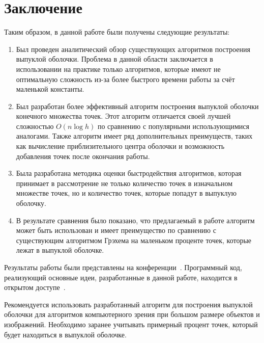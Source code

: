 \chapter*{Заключение}						%


Таким образом, в данной работе были получены следующие результаты:
\begin{enumerate}
	\item Был проведен аналитический обзор существующих алгоритмов построения выпуклой оболочки. Проблема в данной области заключается в использовании на практике только алгоритмов, которые имеют не оптимальную сложность из-за более быстрого времени работы за счёт маленькой константы.
	\item Был разработан более эффективный алгоритм построения выпуклой оболочки конечного множества точек. Этот алгоритм отличается своей лучшей сложностью $O(n \log h)$ по сравнению с популярными использующимися аналогами. Также алгоритм имеет ряд дополнительных преимуществ, таких как вычисление приблизительного центра оболочки и возможность добавления точек после окончания работы.
	\item Была разработана методика оценки быстродействия алгоритмов, которая принимает в рассмотрение не только количество точек в изначальном множестве точек, но и количество точек, которые попадут в выпуклую оболочку.
	\item В результате сравнения было показано, что предлагаемый в работе алгоритм может быть использован и имеет преимущество по сравнению с существующим алгоритмом Грэхема на маленьком проценте точек, которые лежат в выпуклой оболочке.
\end{enumerate}

Результаты работы были представлены на конференции~\cite{matrokhin2018convex}. Программный код, реализующий основные идеи, разработанные в данной работе, находится в открытом доступе~\cite{matrokhin2017github}.

Рекомендуется использовать разработанный алгоритм для построения выпуклой оболочки для алгоритмов компьютерного зрения при большом размере объектов и изображений. Необходимо заранее учитывать примерный процент точек, который будет находиться в выпуклой оболочке.

